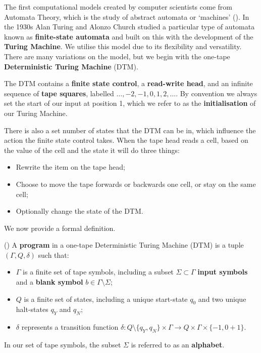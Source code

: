 The first computational models created by computer scientists come from Automata Theory, which is the study of abstract automata or `machines' (\cite{HopcroftJohnE.2014Itat}). In the 1930s Alan Turing and Alonzo Church studied a particular type of automata known as \textbf{finite-state automata} and built on this with the development of the \textbf{Turing Machine}. We utilise this model due to its flexibility and versatility. There are many variations on the model, but we begin with the one-tape \textbf{Deterministic Turing Machine} (DTM).

The DTM contains a \textbf{finite state control}, a \textbf{read-write head}, and an infinite sequence of \textbf{tape squares}, labelled \(\dots,-2,-1,0,1,2,\dots\). By convention we always set the start of our input at position 1, which we refer to as the \textbf{initialisation} of our Turing Machine.



There is also a set number of states that the DTM can be in, which influence the action the finite state control takes. When the tape head reads a cell, based on the value of the cell and the state it will do three things:

\begin{itemize}
    \item Rewrite the item on the tape head;
    \item Choose to move the tape forwards or backwards one cell, or stay on the same cell;
    \item Optionally change the state of the DTM.
\end{itemize}

\noindent We now provide a formal definition.

\begin{definition}
    (\cite{GareyMichaelR1979Cai:}) A \textbf{program} in a one-tape Deterministic Turing Machine (DTM) is a tuple \((\Gamma,Q,\delta)\) such that:
    \begin{itemize}
        \item \(\Gamma\) is a finite set of tape symbols, including a subset $\Sigma \subset \Gamma$ \textbf{input symbols} and a \textbf{blank symbol} $b \in \Gamma \setminus \Sigma$;
        \item \(Q\) is a finite set of states, including a unique start-state \(q_0\) and two unique halt-states \(q_Y\) and \(q_N\);
        \item \(\delta\) represents a transition function \(\delta:Q \setminus \{q_Y,q_N\}
        \times \Gamma \rightarrow Q \times \Gamma \times \{-1,0 +1\}\).
    \end{itemize}
    In our set of tape symbols, the subset $\Sigma$ is referred to as an \textbf{alphabet}.
\end{definition}

